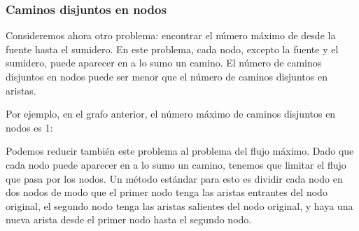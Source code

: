 \subsubsection{Caminos disjuntos en nodos}

Consideremos ahora otro problema:
encontrar el número máximo de
 desde la fuente
hasta el sumidero.
En este problema, cada nodo,
excepto la fuente y el sumidero,
puede aparecer en a lo sumo un camino.
El número de caminos disjuntos en nodos
puede ser menor que el número de
caminos disjuntos en aristas.

Por ejemplo, en el grafo anterior,
el número máximo de caminos disjuntos en nodos es 1:

\begin{center}
\end{center}

Podemos reducir también este problema al problema del flujo máximo.
Dado que cada nodo puede aparecer en a lo sumo un camino,
tenemos que limitar el flujo que pasa por los nodos.
Un método estándar para esto es dividir cada nodo en
dos nodos de modo que el primer nodo tenga las aristas entrantes
del nodo original, el segundo nodo tenga las aristas salientes
del nodo original, y
haya una nueva arista desde el primer nodo
hasta el segundo nodo.

